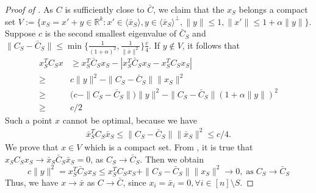\documentclass[11pt]{amsart}
\theoremstyle{plain}
\theoremstyle{definition}
\theoremstyle{remark}
\newcommand{\RR}{\mathbb{R}}
\begin{document}
\begin{appendices}
\begin{proof}[Proof of ]
        As \(C\) is sufficiently close to \(\bar C\), we claim that the \(x_S\) belongs a compact set \(V:=\{x_S=x'+y\in\RR^k: x'\in \langle \bar x_S\rangle, y\in  \langle \bar x_S\rangle^\perp, \|y\|\leq 1, \|x'\|\leq 1 + \alpha\|y\|\}\). Suppose \(c\) is the second smallest eigenvalue of \(\bar C_S\) and \(\|C_S - \bar C_S\| \leq \min\{\tfrac{1}{(1+\alpha)^2},\tfrac{1}{\|\bar x\|^2}\}\tfrac{c}{4}\). If \(y \notin V\), it follows that
        \begin{equation}
        \begin{split}
            x_S^T C_S x&\geq  x_S^T \bar C_S x_S - |x_S^T \bar C_S x_S - x_S^T C_S x_S|\\
                   \geq & c\|y\|^2 - \|C_S - \bar C_S\|\|x_S\|^2\\
                   \geq & \big(c - \|C_S - \bar C_S\|\big)\|y\|^2 - \|C_S - \bar C_S\|(1+\alpha \|y\|)^2\\
                   \geq & c/2
        \end{split}
        \end{equation}
        Such a point \(x\) cannot be optimal, because we have
        \begin{equation}
            \begin{split}
                \bar x_S^T C_S \bar x_S \leq \|C_S - \bar C_S\| \|\bar x_S\|^2 \leq c/4.
            \end{split}
        \end{equation}
        We prove that \(x \in V\) which is a compact set. From , it is true that \(x_SC_Sx_S\rightarrow \bar x_S\bar C_S\bar x_S = 0\), as \(C_S\rightarrow \bar C_S\). Then we obtain
        \[
        c\|y\|^2 = x_S^T \bar C_S x_S \leq  x_S^T  C_S x_S  + \|C_S - \bar C_S\|\|x_S\|^2 \rightarrow 0, \;\text{as}\; C_S\rightarrow \bar C_S
        \]
        Thus, we have \(x\rightarrow \bar x\) as \(C \rightarrow \bar C\), since \(x_i = \bar x_i = 0, \forall i  \in [n]\setminus S\).
    \end{proof}
    
		

\end{appendices}
\end{document}
